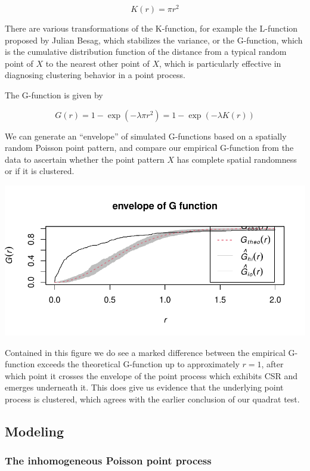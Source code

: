 \documentclass[
  12pt,
]{article}
\begin{document}
\[K(r) = \pi r ^2\]

There are various transformations of the K-function, for example the
L-function proposed by Julian Besag, which stabilizes the variance, or
the G-function, which is the cumulative distribution function of the
distance from a typical random point of \(X\) to the nearest other point
of \(X\), which is particularly effective in diagnosing clustering
behavior in a point process.

The G-function is given by

\[G(r) = 1 - \exp(-\lambda  \pi r^2) = 1 - \exp(-\lambda K(r))\]

We can generate an ``envelope'' of simulated G-functions based on a
spatially random Poisson point pattern, and compare our empirical
G-function from the data to ascertain whether the point pattern \(X\)
has complete spatial randomness or if it is clustered.

\includegraphics{JStevenRaquel_STATS295_Final_files/figure-latex/plot-G-function-1.pdf}

Contained in this figure we do see a marked difference between the
empirical G-function exceeds the theoretical G-function up to
approximately \(r = 1\), after which point it crosses the envelope of
the point process which exhibits CSR and emerges underneath it. This
does give us evidence that the underlying point process is clustered,
which agrees with the earlier conclusion of our quadrat test.

\hypertarget{modeling}{%
\subsection{Modeling}\label{modeling}}

\hypertarget{the-inhomogeneous-poisson-point-process}{%
\subsubsection{The inhomogeneous Poisson point
process}\label{the-inhomogeneous-poisson-point-process}}
\end{document}
